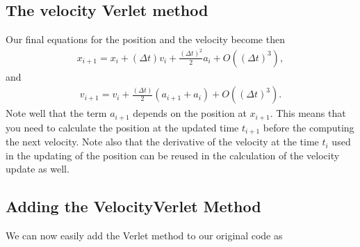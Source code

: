 \documentclass[letterpaper,10pt,english]{sphinxmanual}
\begin{document}
\subsection{The velocity Verlet method}
\label{\detokenize{chapter3:the-velocity-verlet-method}}
Our final equations for the position and the velocity become then
\begin{equation*}
\begin{split}
x_{i+1} = x_i+(\Delta t)v_i+\frac{(\Delta t)^2}{2}a_{i}+O((\Delta t)^3),
\end{split}
\end{equation*}
and
\begin{equation*}
\begin{split}
v_{i+1} = v_i+\frac{(\Delta t)}{2}\left(a_{i+1}+a_{i}\right)+O((\Delta t)^3).
\end{split}
\end{equation*}
Note well that the term \(a_{i+1}\) depends on the position at \(x_{i+1}\). This means that you need to calculate
the position at the updated time \(t_{i+1}\) before the computing the next velocity.  Note also that the derivative of the velocity at the time
\(t_i\) used in the updating of the position can be reused in the calculation of the velocity update as well.


\subsection{Adding the Velocity\sphinxhyphen{}Verlet Method}
\label{\detokenize{chapter3:adding-the-velocity-verlet-method}}
We can now easily add the Verlet method to our original code as
\end{document}
